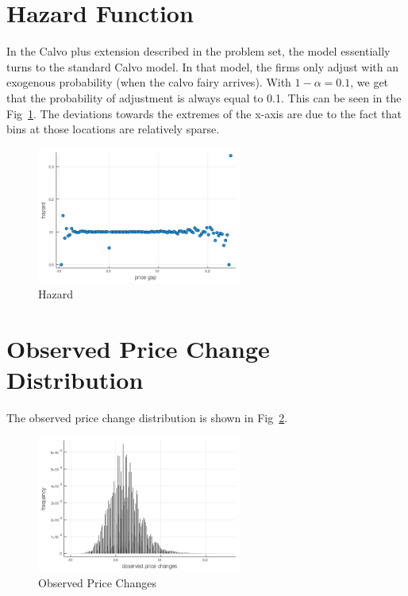 \section{Hazard Function}

In the Calvo plus extension described in the problem set, the model essentially turns to the standard Calvo model. In that model, the firms only adjust with an exogenous probability (when the calvo fairy arrives). With $1-\alpha = 0.1$, we get that the probability of adjustment is always equal to 0.1. This can be seen in the Fig~\ref{hzcp}. The deviations towards the extremes of the x-axis are due to the fact that bins at those locations are relatively sparse.
\begin{figure}[H]
    \centering
    \includegraphics[width = 0.6\textwidth]{../tasks/Calvo_Plus/output/hazard_cp.png}
    \caption{Hazard}
    \label{hzcp}
\end{figure}

\section{Observed Price Change Distribution}

The observed price change distribution is shown in Fig~\ref{pccp}.
\begin{figure}[H]
    \centering
    \includegraphics[width = 0.6\textwidth]{../tasks/Calvo_Plus/output/observed_p_changes_cp.png}
    \caption{Observed Price Changes}
    \label{pccp}
\end{figure}

